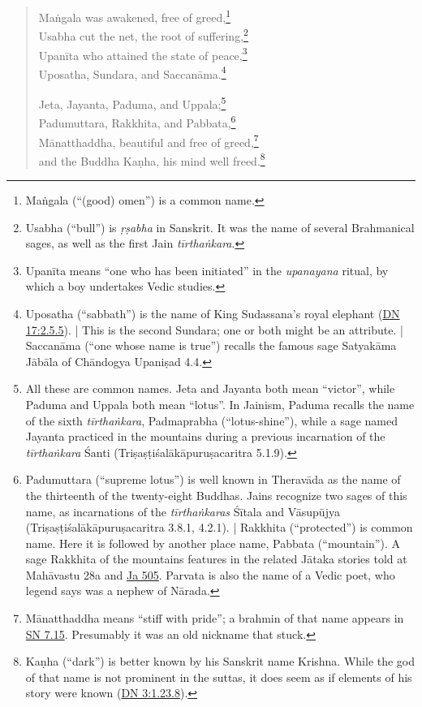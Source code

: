 \documentclass[12pt,openany]{book}%
\begin{document}
\begin{verse}
\textsanskrit{Maṅgala} was awakened, free of greed,\footnote{\textsanskrit{Maṅgala} (“(good) omen”) is a common name. } \\
Usabha cut the net, the root of suffering,\footnote{Usabha (“bull”) is \textit{\textsanskrit{ṛṣabha}} in Sanskrit. It was the name of several Brahmanical sages, as well as the first Jain \textit{\textsanskrit{tīrthaṅkara}}. } \\
\textsanskrit{Upanīta} who attained the state of peace,\footnote{\textsanskrit{Upanīta} means “one who has been initiated” in the \textit{upanayana} ritual, by which a boy undertakes Vedic studies. } \\
Uposatha, Sundara, and \textsanskrit{Saccanāma}.\footnote{Uposatha (“sabbath”) is the name of King Sudassana’s royal elephant (\href{https://suttacentral.net/dn17/en/sujato\#2.5.5}{DN 17:2.5.5}). | This is the second Sundara; one or both might be an attribute. | \textsanskrit{Saccanāma} (“one whose name is true”) recalls the famous sage \textsanskrit{Satyakāma} \textsanskrit{Jābāla} of \textsanskrit{Chāndogya} \textsanskrit{Upaniṣad} 4.4. } 

Jeta, Jayanta, Paduma, and Uppala;\footnote{All these are common names. Jeta and Jayanta both mean “victor”, while Paduma and Uppala both mean “lotus”. In Jainism, Paduma recalls the name of the sixth \textit{\textsanskrit{tīrthaṅkara}}, Padmaprabha (“lotus-shine”), while a sage named Jayanta practiced in the mountains during a previous incarnation of the \textit{\textsanskrit{tīrthaṅkara}} Śanti (\textsanskrit{Triṣaṣṭiśalākāpuruṣacaritra} 5.1.9). } \\
Padumuttara, Rakkhita, and Pabbata,\footnote{Padumuttara (“supreme lotus”) is well known in \textsanskrit{Theravāda} as the name of the thirteenth of the twenty-eight Buddhas. Jains recognize two sages of this name, as incarnations of the \textit{\textsanskrit{tīrthaṅkaras}} \textsanskrit{Śītala} and \textsanskrit{Vāsupūjya} (\textsanskrit{Triṣaṣṭiśalākāpuruṣacaritra} 3.8.1, 4.2.1). | Rakkhita (“protected”) is common name. Here it is followed by another place name, Pabbata (“mountain”). A sage Rakkhita of the mountains features in the related \textsanskrit{Jātaka} stories told at \textsanskrit{Mahāvastu} 28a and \href{https://suttacentral.net/ja505/en/sujato}{Ja 505}. Parvata is also the name of a Vedic poet, who legend says was a nephew of \textsanskrit{Nārada}. } \\
\textsanskrit{Mānatthaddha}, beautiful and free of greed,\footnote{\textsanskrit{Mānatthaddha} means “stiff with pride”; a brahmin of that name appears in \href{https://suttacentral.net/sn7.15/en/sujato}{SN 7.15}. Presumably it was an old nickname that stuck. } \\
and the Buddha \textsanskrit{Kaṇha}, his mind well freed.\footnote{\textsanskrit{Kaṇha} (“dark”) is better known by his Sanskrit name Krishna. While the god of that name is not prominent in the suttas, it does seem as if elements of his story were known (\href{https://suttacentral.net/dn3/en/sujato\#1.23.8}{DN 3:1.23.8}). } 


\end{verse}
\end{document}

